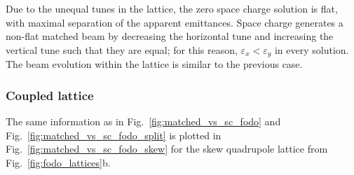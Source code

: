 %
Due to the unequal tunes in the lattice, the zero space charge solution is flat, with maximal separation of the apparent emittances. Space charge generates a non-flat matched beam by decreasing the horizontal tune and increasing the vertical tune such that they are equal; for this reason, $\varepsilon_x < \varepsilon_y$ in every solution. The beam evolution within the lattice is similar to the previous case.


\subsubsection{Coupled lattice}

The same information as in Fig.~\ref{fig:matched_vs_sc_fodo} and Fig.~\ref{fig:matched_vs_sc_fodo_split} is plotted in Fig.~\ref{fig:matched_vs_sc_fodo_skew} for the skew quadrupole lattice from Fig.~\ref{fig:fodo_lattices}b.
%
